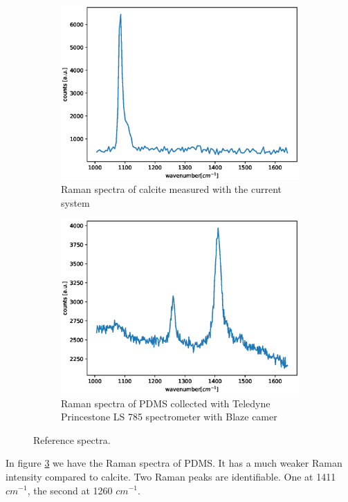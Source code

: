 \documentclass{osa-article}
\begin{document}
\begin{figure}
\begin{subfigure}{.5\textwidth}
    \centering
    \includegraphics[scale = 0.4]{figure/spectra_marble.eps}
    \caption{Raman spectra of calcite measured with the current system}
    \label{fig:Marble_ref}
\end{subfigure}
\begin{subfigure}{.5\textwidth}
    \centering
    \includegraphics[scale = 0.4]{figure/spectra_PDMS.eps}
    \caption{Raman spectra of PDMS collected with Teledyne Princestone LS 785 spectrometer with Blaze camer}
    \label{fig:PDMS_ref}
\end{subfigure}
\caption{Reference spectra.}
\end{figure}
In figure \ref{fig:PDMS_ref} we have the Raman spectra of PDMS. It has a much weaker Raman intensity compared to calcite. Two Raman peaks are identifiable. One at 1411 $cm^{-1}$, the second at 1260 $cm^{-1}$.
\end{document}
